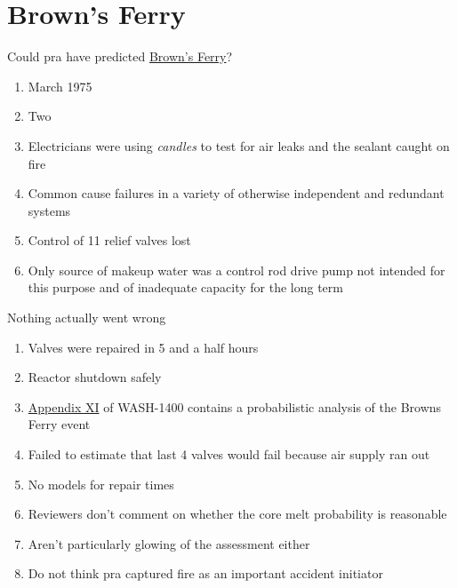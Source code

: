 \documentclass[aspectratio=1610,pdftex,dvipsnames,compress,xcolor={dvipsnames}]{beamer}
\newcommand{\acs}{\acrshort} %
\newcommand{\acsp}{\acrshortpl} %
\begin{document}
\section{Brown's Ferry}


\addtocounter{framenumber}{-1}
\begin{frame}{Could \acs{pra} have predicted \href{http://www.ccnr.org/browns_ferry.html}{Brown's Ferry}?}
    \begin{enumerate}[series=outerlist,topsep=0pt,itemsep=21pt,leftmargin=*,label=(\arabic*)]
        \item[]March 1975  
        \item[]Two \acsp{bwr}
        \item[]Electricians were using \textit{candles} to test for air leaks and the sealant caught on fire
        \item[]Common cause failures in a variety of otherwise independent and redundant systems
        \item[]Control of 11 relief valves lost  
        \item[]Only source of makeup water was a control rod drive pump not intended for this purpose and of inadequate capacity for the long term
    \end{enumerate}
\end{frame}


\begin{frame}{Nothing actually went wrong}
    \begin{enumerate}[series=outerlist,topsep=0pt,itemsep=15pt,leftmargin=*,label=(\arabic*)]
        \item[]Valves were repaired in 5 and a half hours 
        \item[]Reactor shutdown safely
        \item[]\href{https://www.osti.gov/biblio/7327154}{Appendix XI} of WASH-1400 contains a probabilistic analysis of the Browns Ferry event
        \item[]Failed to estimate that last 4 valves would fail because air supply ran out  
        \item[]No models for repair times
        \item[]Reviewers don't comment on whether the core melt probability is reasonable
        \item[]Aren't particularly glowing of the assessment either  
        \item[]Do not think \acs{pra} captured fire as an important accident initiator
    \end{enumerate}
\end{frame}
\end{document}
